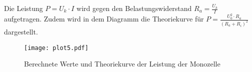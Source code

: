 Die Leistung $P=U_k \cdot I$ wird gegen den Belastungswiderstand $R_a = \frac{U_k}{I}$ aufgetragen. Zudem wird in dem
Diagramm die Theoriekurve für $P = \frac{U_0^2 \cdot R_a}{(R_a + R_i)^2}$ dargestellt.

\begin{figure}[H]
  \centering
  \texttt{[image: plot5.pdf]}
  \caption{Berechnete Werte und Theoriekurve der Leistung der Monozelle}
  \label{fig:plot5}
\end{figure}
